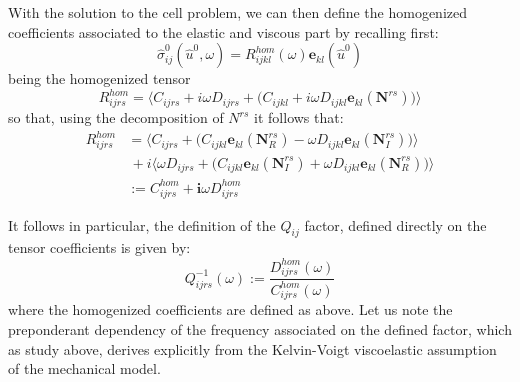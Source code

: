 With the solution to the cell problem, we can then define the homogenized coefficients associated to the elastic and viscous part by recalling first:
\begin{equation*}
    \hat{\sigma}_{ij}^0 (\hat{u}^0,\omega) = R_{ijkl}^{hom} (\omega) \mathbf{e}_{kl}(\hat{u}^0)
\end{equation*}
being the homogenized tensor
\begin{equation*}
    R^{hom}_{ijrs}= \big \langle  C_{ijrs} + i\omega D_{ijrs} + \big( C_{ijkl} + i \omega D_{ijkl} \mathbf{e}_{kl}(\mathbf{N}^{rs}) \big) \big \rangle  
\end{equation*}
so that, using the decomposition of $N^{rs}$ it follows that:
\begin{align*}
    R^{hom}_{ijrs} &= \big \langle C_{ijrs} + \big( C_{ijkl}\mathbf{e}_{kl}( \mathbf{N}^{rs}_R) -\omega D_{ijkl}\mathbf{e}_{kl}(\mathbf{N}^{rs}_I) \big) \big \rangle \\
    & \, + i \big \langle \omega D_{ijrs} + \big( C_{ijkl} \mathbf{e}_{kl}(\mathbf{N}^{rs}_I) + \omega D_{ijkl}\mathbf{e}_{kl}(\mathbf{N}^{rs}_R) \big) \big \rangle \\
    & := C^{hom}_{ijrs} + \mathbf{i} \omega D^{hom}_{ijrs}
\end{align*}

It follows in particular, the definition of the $Q_{ij}$ factor, defined directly on the tensor coefficients is given by:
\begin{equation}
    \label{Qfactor-Def}
    Q_{ijrs}^{-1}(\omega) := \frac{D^{hom}_{ijrs}(\omega)}{ C^{hom}_{ijrs}(\omega)}
\end{equation}
where the homogenized coefficients are defined as above.
Let us note the preponderant dependency of the frequency associated on the defined factor, which as study above, derives explicitly from the Kelvin-Voigt viscoelastic assumption of the mechanical model. 

